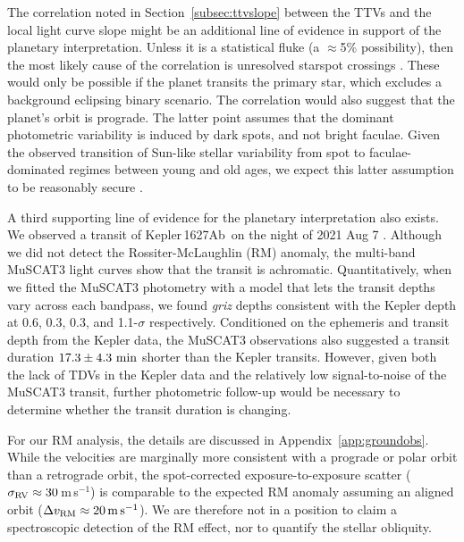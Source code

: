 \documentclass[12pt,modern,twocolumn,tighten]{aastex63}
\newcommand{\pn}{Kepler\,1627Ab} %
\newcommand{\ms}{\,m\,s$^{-1}$}
\begin{document}
The correlation noted in Section~\ref{subsec:ttvslope} between the
TTVs and the local light curve slope might be an additional line of evidence
in support of the planetary interpretation.  Unless it is a
statistical fluke (a $\approx$5\% possibility), then the most likely
cause of the correlation is unresolved starspot
crossings \citep{mazeh_time_2015}.  These would only be possible if the
planet transits the primary star, which excludes a background
eclipsing binary scenario.  The correlation would also suggest that the planet's
orbit is prograde.  The latter point assumes that the dominant
photometric variability is induced by dark spots, and not bright
faculae.  Given the observed transition of Sun-like stellar
variability from spot to faculae-dominated regimes between young and
old ages, we expect this latter assumption to be reasonably secure
\citep{shapiro_are_2016,montet_long-term_2017,reinhold_stellar_2020}.


A third supporting line of evidence for the planetary interpretation
also exists.  We observed a transit of \pn\ on the
night of 2021 Aug 7 .    Although we did not detect the
Rossiter-McLaughlin (RM) anomaly, the multi-band MuSCAT3 light curves
show that the transit is achromatic.
Quantitatively, when we fitted the MuSCAT3
photometry with a model that lets the transit depths vary across each
bandpass, we found {\it griz} depths consistent with the Kepler depth
at 0.6, 0.3, 0.3, and 1.1-$\sigma$ respectively.    Conditioned on the
ephemeris and transit depth from the Kepler data, the MuSCAT3 observations also
suggested a transit duration $17.3\pm4.3\ {\rm min}$ shorter than the
Kepler transits.
However, given both the lack of TDVs in the Kepler data
and the relatively low signal-to-noise of the MuSCAT3 transit,
further photometric follow-up would be necessary to determine
whether the transit duration is  changing.  

For our RM analysis,
the details are discussed in Appendix~\ref{app:groundobs}.  While the
velocities are marginally more consistent with a prograde or polar
orbit than a retrograde orbit, the spot-corrected exposure-to-exposure
scatter ($\sigma_{\rm RV}\approx 30$\ms) is comparable to the expected
RM anomaly assuming an aligned orbit ($\Delta v_{\rm RM}\approx
20\,{\rm m\,s}^{-1}$).  We are therefore not in a position to claim a
spectroscopic detection of the RM effect, nor to quantify the stellar
obliquity.
\end{document}
